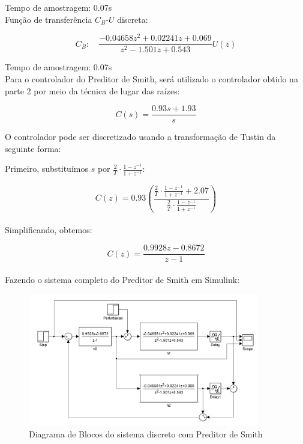 \documentclass[a4paper,12pt]{article}
\begin{document}
Tempo de amostragem: 0.07s\\

Função de transferência \(C_B\)-\(U\) discreta:

\begin{equation}
C_B: \quad \frac{-0.04658 z^2 + 0.02241 z + 0.069}{z^2 - 1.501 z + 0.543}U(z)
\end{equation}

Tempo de amostragem: 0.07s \\

Para o controlador do Preditor de Smith, será utilizado o controlador obtido na parte 2 por meio da técnica de lugar das raízes:

\begin{equation}
C(s) = \frac{0.93 s + 1.93}{s}
\end{equation}

O controlador pode ser discretizado usando a transformação de Tustin da seguinte forma:

Primeiro, substituímos \( s \) por \( \frac{2}{T} \cdot \frac{1 - z^{-1}}{1 + z^{-1}} \):

\[
C(z) = 0.93\left(\frac{\frac{2}{T} \cdot \frac{1 - z^{-1}}{1 + z^{-1}} + 2.07}{\frac{2}{T} \cdot \frac{1 - z^{-1}}{1 + z^{-1}}}\right)
\]\\

Simplificando, obtemos:

\[
C(z) = \frac{0.9928z - 0.8672}{z-1}
\]\\

Fazendo o sistema completo do Preditor de Smith em Simulink:

 \begin{figure}[H]
  \centering
  \includegraphics[width=0.9\textwidth]{Imagens/q1.png}
  \caption{Diagrama de Blocos do sistema discreto com Preditor de Smith}
  \end{figure}
\end{document}
